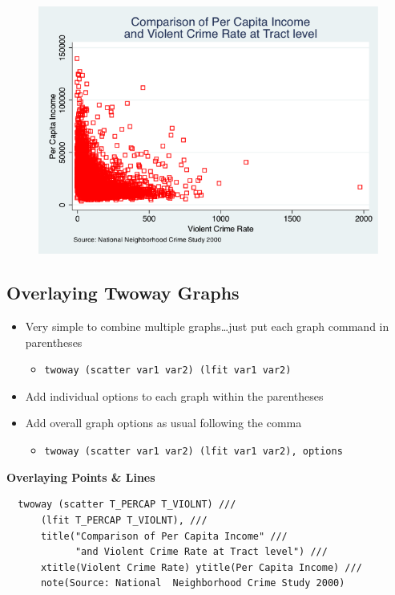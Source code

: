 \documentclass[]{book}
\providecommand{\tightlist}{%
  \setlength{\itemsep}{0pt}\setlength{\parskip}{0pt}}
\begin{document}
\begin{figure}
\centering
\includegraphics{Stata/StataModGraph/images/msymbol_mcolor.png}
\caption{}
\end{figure}

\subsection{Overlaying Twoway Graphs}\label{overlaying-twoway-graphs}

\begin{itemize}
\tightlist
\item
  Very simple to combine multiple graphs\ldots{}just put each graph
  command in parentheses

  \begin{itemize}
  \tightlist
  \item
    \texttt{twoway\ (scatter\ var1\ var2)\ (lfit\ var1\ var2)}
  \end{itemize}
\item
  Add individual options to each graph within the parentheses
\item
  Add overall graph options as usual following the comma

  \begin{itemize}
  \tightlist
  \item
    \texttt{twoway\ (scatter\ var1\ var2)\ (lfit\ var1\ var2),\ options}
  \end{itemize}
\end{itemize}

\textbf{Overlaying Points \& Lines}

\begin{verbatim}
  twoway (scatter T_PERCAP T_VIOLNT) ///
      (lfit T_PERCAP T_VIOLNT), ///
      title("Comparison of Per Capita Income" ///
            "and Violent Crime Rate at Tract level") ///
      xtitle(Violent Crime Rate) ytitle(Per Capita Income) ///
      note(Source: National  Neighborhood Crime Study 2000)
\end{verbatim}
\end{document}
